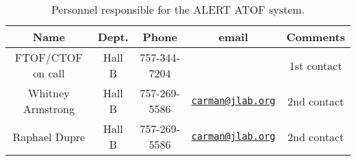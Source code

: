 \begin{table}[!htb]
\centering
\begin{tabular}{|c|c|c|c|c|} \hline
Name              & Dept.  & Phone        & email & Comments \\ \hline
FTOF/CTOF on call & Hall B & 757-344-7204 &       & 1st contact \\ \hline
Whitney Armstrong & Hall B & 757-269-5586 & \href{mailto:carman@jlab.org}{\nolinkurl{carman@jlab.org}} & 2nd contact \\ \hline
Raphael Dupre     & Hall B & 757-269-5586 & \href{mailto:carman@jlab.org}{\nolinkurl{carman@jlab.org}} & 2nd contact \\ \hline
\end{tabular}
\caption{Personnel responsible for the ALERT ATOF system.} 
\label{tb:atof}
\end{table}
